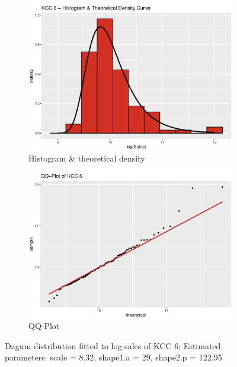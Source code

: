 \begin{figure}[H]
\centering
\begin{subfigure}{.45\textwidth}
  \centering
  \includegraphics[width=\linewidth]{figures/kcc_6_density.eps}
  \caption{Histogram \& theoretical density}
  \label{fig:kcc_6_density}
\end{subfigure}
\begin{subfigure}{.45\textwidth}
  \centering
  \includegraphics[width=\linewidth]{figures/kcc_6_qqplot.eps}
  \caption{QQ-Plot}
  \label{fig:kcc_6_qqplot}
\end{subfigure}
\caption{Dagum distribution fitted to log-sales of \ac{KCC} 6; Estimated parameters: scale = 8.32, shape1.a = 29, shape2.p = 122.95}
\label{fig:kcc_6_marginal}
\end{figure} 




